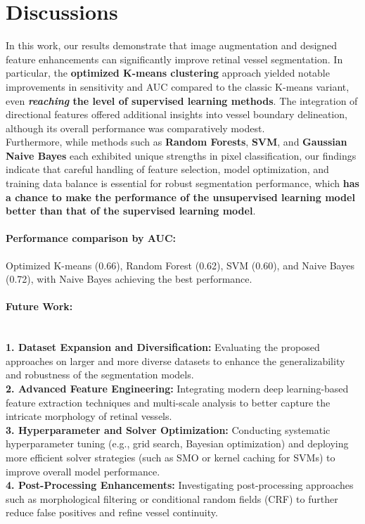 \documentclass[final]{article}
\begin{document}
\section{Discussions}
In this work, our results demonstrate that image augmentation and designed feature enhancements can significantly improve retinal vessel segmentation. In particular, the \textbf{optimized K-means clustering} approach yielded notable improvements in sensitivity and AUC compared to the classic K-means variant, even \textbf{\textit{reaching} the level of supervised learning methods}. The integration of directional features offered additional insights into vessel boundary delineation, although its overall performance was comparatively modest. \\
Furthermore, while methods such as \textbf{Random Forests}, \textbf{SVM}, and \textbf{Gaussian Naive Bayes} each exhibited unique strengths in pixel classification, our findings indicate that careful handling of feature selection, model optimization, and training data balance is essential for robust segmentation performance, which \textbf{has a chance to make the performance of the unsupervised learning model better than that of the supervised learning model}. 
\vspace{-0.25cm}
\paragraph{Performance comparison by AUC:} Optimized K-means (0.66), Random Forest (0.62), SVM (0.60), and Naive Bayes (0.72), with Naive Bayes achieving the best performance.
\vspace{-0.25cm}
\paragraph{Future Work:} \hfill \\
\textbf{1. Dataset Expansion and Diversification:} Evaluating the proposed approaches on larger and more diverse datasets to enhance the generalizability and robustness of the segmentation models. \\
\textbf{2. Advanced Feature Engineering:} Integrating modern deep learning-based feature extraction techniques and multi-scale analysis to better capture the intricate morphology of retinal vessels. \\
\textbf{3. Hyperparameter and Solver Optimization:} Conducting systematic hyperparameter tuning (e.g., grid search, Bayesian optimization) and deploying more efficient solver strategies (such as SMO or kernel caching for SVMs) to improve overall model performance. \\
\textbf{4. Post-Processing Enhancements:} Investigating post-processing approaches such as morphological filtering or conditional random fields (CRF) to further reduce false positives and refine vessel continuity.
\newpage
\end{document}
